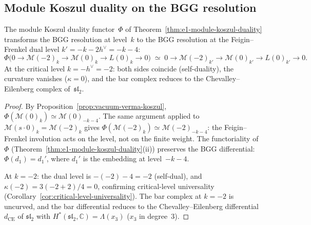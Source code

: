 \subsection{Module Koszul duality on the BGG resolution}

\begin{corollary}
\label{cor:bgg-koszul-involution}

The module Koszul duality functor~$\Phi$ of
Theorem~\textup{\ref{thm:e1-module-koszul-duality}}
transforms the BGG resolution at level~$k$
to the BGG resolution at the Feigin--Frenkel
dual level $k' = -k - 2h^\vee = -k - 4$:
\begin{equation}\label{eq:bgg-koszul-involution}
\Phi\bigl(0 \to \mathcal{M}(-2)_k \to
\mathcal{M}(0)_k \to L(0)_k \to 0\bigr)
\;\simeq\;
0 \to \mathcal{M}(-2)_{k'} \to
\mathcal{M}(0)_{k'} \to L(0)_{k'} \to 0.
\end{equation}
At the critical level $k = -h^\vee = -2$: both sides
coincide \textup{(}self-duality\textup{)}, the curvature
vanishes \textup{(}$\kappa = 0$\textup{)}, and the bar
complex reduces to the Chevalley--Eilenberg complex
of~$\mathfrak{sl}_2$.
\end{corollary}

\begin{proof}
By Proposition~\ref{prop:vacuum-verma-koszul},
$\Phi(\mathcal{M}(0)_k) \simeq \mathcal{M}(0)_{-k-4}$.
The same argument applied to
$\mathcal{M}(s \cdot 0)_k = \mathcal{M}(-2)_k$ gives
$\Phi(\mathcal{M}(-2)_k) \simeq \mathcal{M}(-2)_{-k-4}$:
the Feigin--Frenkel involution
acts on the level, not on the finite weight.
The functoriality of~$\Phi$
(Theorem~\ref{thm:e1-module-koszul-duality}(ii))
preserves the BGG differential:
$\Phi(d_1) = d_1'$, where $d_1'$ is the embedding at
level~$-k-4$.

At $k = -2$: the dual level is $-(-2) - 4 = -2$
(self-dual), and $\kappa(-2) = 3(-2+2)/4 = 0$,
confirming critical-level universality
(Corollary~\ref{cor:critical-level-universality}).
The bar complex at $k = -2$ is uncurved, and the
bar differential reduces to the Chevalley--Eilenberg
differential $d_{\mathrm{CE}}$ of $\mathfrak{sl}_2$
with $H^*(\mathfrak{sl}_2, \mathbb{C}) = \Lambda(x_3)$
($x_3$ in degree~$3$).
\end{proof}


